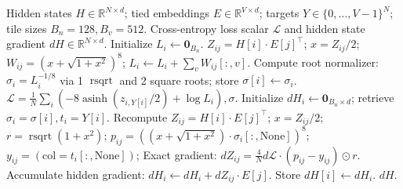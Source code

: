 \documentclass[11pt,a4paper]{article}
\theoremstyle{definition}
\newcommand{\rsqrt}{\operatorname{rsqrt}}
\newcommand{\asinh}{\operatorname{asinh}}
\begin{document}
\begin{algorithm}[H]
\caption{Pure Algebraic Likelihood and Fused Backward (Alg-CE)}
\label{alg:alg_ce}
\begin{algorithmic}[1]
\Require Hidden states $H \in \mathbb{R}^{N \times d}$; tied embeddings $E \in \mathbb{R}^{V \times d}$; targets $Y \in \{0, \dots, V-1\}^N$; tile sizes $B_n = 128, B_v = 512$.
\Ensure Cross-entropy loss scalar $\mathcal{L}$ and hidden state gradient $dH \in \mathbb{R}^{N \times d}$.
        \State Initialize $L_i \leftarrow \mathbf{0}_{B_n}$.
            \State $Z_{ij} = H[i] \cdot E[j]^\top$; \quad $x = Z_{ij}/2$; \quad $W_{ij} = (x + \sqrt{1 + x^2})^8$; \quad $L_i \leftarrow L_i + \sum_v W_{ij}[:, v]$.
        \EndFor
        \State Compute root normalizer: $\sigma_i = L_i^{-1/8}$ via 1 $\rsqrt$ and 2 square roots; store $\sigma[i] \leftarrow \sigma_i$.
    \EndFor
    \State \Return $\mathcal{L} = \frac{1}{N}\sum_i \left( -8 \asinh(z_{i, Y[i]}/2) + \log L_i \right), \sigma$.
\EndProcedure
{}
        \State Initialize $dH_i \leftarrow \mathbf{0}_{B_n \times d}$; retrieve $\sigma_i = \sigma[i], t_i = Y[i]$.
            \State Recompute $Z_{ij} = H[i] \cdot E[j]^\top$; \quad $x = Z_{ij}/2$; \quad $r = \rsqrt(1 + x^2)$;
            \State $p_{ij} = \left((x + \sqrt{1 + x^2}) \cdot \sigma_i[:, \text{None}]\right)^8$; \quad $y_{ij} = (\text{col} = t_i[:, \text{None}])$;
            \State Exact gradient: $dZ_{ij} = \frac{4}{N} d\mathcal{L} \cdot (p_{ij} - y_{ij}) \odot r$.
            \State Accumulate hidden gradient: $dH_i \leftarrow dH_i + dZ_{ij} \cdot E[j]$.
        \EndFor
        \State Store $dH[i] \leftarrow dH_i$.
    \EndFor
    \State \Return $dH$.
\EndProcedure
\end{algorithmic}
\end{algorithm}
\end{document}
